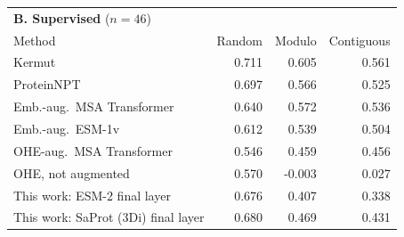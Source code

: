 \documentclass[11pt,a4paper]{article}
\begin{document}
\begin{table}[H]
\begin{tabular}{lrr}
\bottomrule
\end{tabular}
\vspace{6pt}
\begin{tabular}{lrrr}
\toprule
\multicolumn{4}{l}{\textbf{B. Supervised} ($n=46$)} \\
Method & Random & Modulo & Contiguous \\
\midrule
Kermut & 0.711 & 0.605 & 0.561 \\
ProteinNPT & 0.697 & 0.566 & 0.525 \\
Emb.-aug.\ MSA Transformer & 0.640 & 0.572 & 0.536 \\
Emb.-aug.\ ESM-1v & 0.612 & 0.539 & 0.504 \\
OHE-aug.\ MSA Transformer & 0.546 & 0.459 & 0.456 \\
OHE, not augmented & 0.570 & -0.003 & 0.027 \\
\midrule
This work: ESM-2 final layer & 0.676 & 0.407 & 0.338 \\
This work: SaProt (3Di) final layer & 0.680 & 0.469 & 0.431 \\
\bottomrule
\end{tabular}\end{table}
\end{document}
